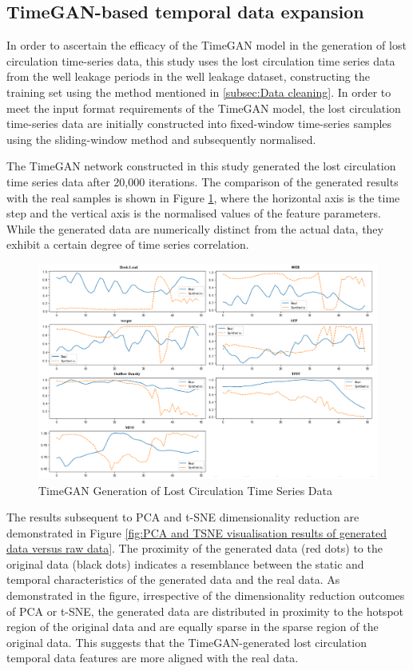\documentclass[journal,article,submit,pdftex,moreauthors]{Definitions/mdpi}
\begin{document}
\subsection{TimeGAN-based temporal data expansion}

In order to ascertain the efficacy of the TimeGAN model in the generation of lost circulation time-series data, this study uses the lost circulation time series data from the well leakage periods in the well leakage dataset, constructing the training set using the method mentioned in \ref{subsec:Data cleaning}. In order to meet the input format requirements of the TimeGAN model, the lost circulation time-series data are initially constructed into fixed-window time-series samples using the sliding-window method and subsequently normalised. 

The TimeGAN network constructed in this study generated the lost circulation time series data after 20,000 iterations. The comparison of the generated results with the real samples is shown in Figure   \ref{fig:TimeGAN Generation of Lost Circulation Time Series Data}, where the horizontal axis is the time step and the vertical axis is the normalised values of the feature parameters. While the generated data are numerically distinct from the actual data, they exhibit a certain degree of time series correlation. 

\begin{figure}[H]
    \centering
    \includegraphics[width=0.75\linewidth]{图片/timeGan数据生成.png}
    \caption{TimeGAN Generation of Lost Circulation Time Series Data}
    \label{fig:TimeGAN Generation of Lost Circulation Time Series Data}
\end{figure}


The results subsequent to PCA and t-SNE dimensionality reduction are demonstrated in Figure \ref{fig:PCA and TSNE visualisation results of generated data versus raw data}. The proximity of the generated data (red dots) to the original data (black dots) indicates a resemblance between the static and temporal characteristics of the generated data and the real data. As demonstrated in the figure, irrespective of the dimensionality reduction outcomes of PCA or t-SNE, the generated data are distributed in proximity to the hotspot region of the original data and are equally sparse in the sparse region of the original data. This suggests that the TimeGAN-generated lost circulation temporal data features are more aligned with the real data.
\end{document}
